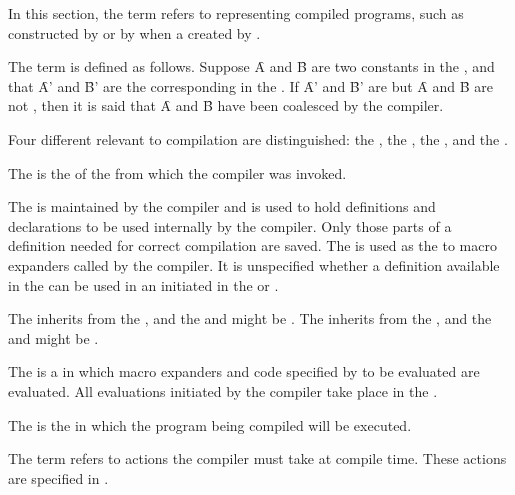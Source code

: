 In this section, the term  refers to 
 representing compiled programs, such as  constructed
by  or by  when  a 
created by .
 
The term  is defined as follows.
Suppose \f{A} and \f{B} are two constants in the ,
and that \f{A'} and \f{B'} are the corresponding  in the .
If \f{A'} and \f{B'} are  but
\f{A} and \f{B} are not , then it is said
that \f{A} and \f{B} have been coalesced by the compiler.
 
Four different  relevant to compilation are
distinguished:
  the ,
  the ,
  the , and
  the .

The  is
the  of the  from which the compiler was invoked.

The  is maintained by the compiler
and is used to hold definitions and declarations to be used internally
by the compiler.  Only those parts of a definition needed for correct
compilation are saved. The  is used
as the   to macro expanders called by
the compiler. It is unspecified whether a definition available in the
 can be used in an 
initiated in the  or .

The  inherits from
the ,
and the  and  
might be .
The  inherits from
the , 
and the  and  
might be .

The  is a 
in which macro expanders and code specified by 
to be evaluated are evaluated.  All evaluations initiated by the
compiler take place in the .

The  is the 
 in which the program being compiled will be executed.

The term  refers to actions the compiler
must take at compile time. These actions are specified in 
\secref\CompilationSemantics.

